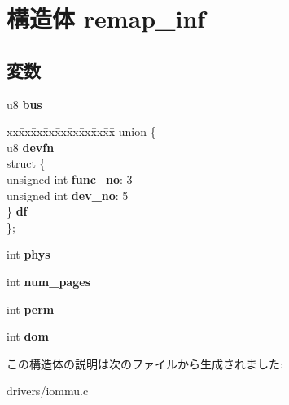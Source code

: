 \section{構造体 remap\-\_\-inf}
\label{structremap__inf}
\subsection*{変数}
\begin{DoxyCompactItemize}
\item 
u8 {\bfseries bus}\label{structremap__inf_a580f9145f92e4519518a4ca7ec4470e1}

\item 
\begin{tabbing}
xx\=xx\=xx\=xx\=xx\=xx\=xx\=xx\=xx\=\kill
union \{\\
\>u8 {\bfseries devfn}\\
\>struct \{\\
\>\>unsigned int {\bfseries func\_no}: 3\\
\>\>unsigned int {\bfseries dev\_no}: 5\\
\>\} {\bfseries df}\\
\}; \label{structremap__inf_a84ce2520562ceb0b4da574ea05383b80}
\\

\end{tabbing}\item 
int {\bfseries phys}\label{structremap__inf_a0fcc99d35bfc7374e758e743fb2e4dee}

\item 
int {\bfseries num\-\_\-pages}\label{structremap__inf_af2b698bf41d6ad470284a6c29bcac936}

\item 
int {\bfseries perm}\label{structremap__inf_a9e3e1739571ba4832fcdce8e978a20ad}

\item 
int {\bfseries dom}\label{structremap__inf_a9dbb15fa353bc503a9a5c13e32adf425}

\end{DoxyCompactItemize}


この構造体の説明は次のファイルから生成されました\-:\begin{DoxyCompactItemize}
\item 
drivers/iommu.\-c\end{DoxyCompactItemize}
